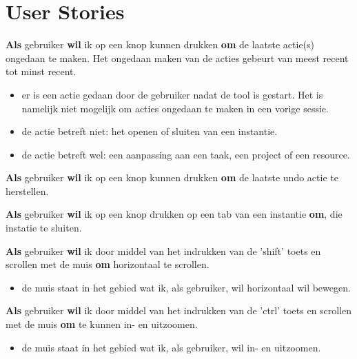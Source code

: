 \section{User Stories}
\setcounter{userstory}{0}
\nextUserStory
\textbf{Als} gebruiker \textbf{wil} ik op een knop kunnen drukken \textbf{om} de laatste actie(s) ongedaan te maken. Het ongedaan maken van de acties gebeurt van meest recent tot minst recent. 
\begin{itemize} [label=\emph{ - Gegeven}, itemindent=2.5em, labelsep=0.3em]
    \item er is een actie gedaan door de gebruiker nadat de tool is gestart. Het is namelijk niet mogelijk om acties ongedaan te maken in een vorige sessie. 
    \item de actie betreft niet: het openen of sluiten van een instantie.
    \item de actie betreft wel: een aanpassing aan een taak, een project of een resource. 
\end{itemize}

\nextUserStory
\textbf{Als} gebruiker \textbf{wil} ik op een knop kunnen drukken \textbf{om} de laatste undo actie te herstellen. 

\nextUserStory
\textbf{Als} gebruiker \textbf{wil} ik op een knop drukken op een tab van een instantie \textbf{om}, die instatie te sluiten. 

\nextUserStory
\textbf{Als} gebruiker \textbf{wil} ik door middel van het indrukken van de 'shift' toets en scrollen met de muis \textbf{om} horizontaal te scrollen. 
\begin{itemize} [label=\emph{ - Gegeven}, itemindent=2.5em, labelsep=0.3em]
    \item de muis staat in het gebied wat ik, als gebruiker, wil horizontaal wil bewegen. 
\end{itemize}

\nextUserStory
\textbf{Als} gebruiker \textbf{wil} ik door middel van het indrukken van de 'ctrl' toets en scrollen met de muis \textbf{om} te kunnen in- en uitzoomen. 
\begin{itemize} [label=\emph{ - Gegeven}, itemindent=2.5em, labelsep=0.3em]
    \item de muis staat in het gebied wat ik, als gebruiker, wil in- en uitzoomen. 
\end{itemize}

